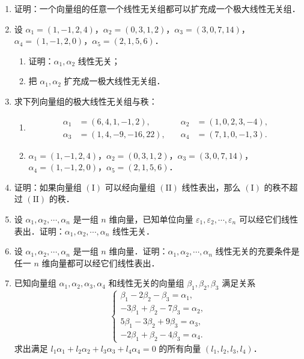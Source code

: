 \begin{enumerate}
  \ansproof
  \item 证明：一个向量组的任意一个线性无关组都可以扩充成一个极大线性无关组．
  \ansproof
  \item 设 $\alpha_1=(1,-1,2,4)$，$\alpha_2=(0,3,1,2)$，$\alpha_3=(3,0,7,14)$，$\alpha_4=(1,-1,2,0)$，$\alpha_5=(2,1,5,6)$．
  \begin{enumerate}
    \item 证明：$\alpha_1,\alpha_2$ 线性无关；
  \anssub
    \item 把 $\alpha_1,\alpha_2$ 扩充成一极大线性无关组．
  \anssub
  \end{enumerate}
  \item 求下列向量组的极大线性无关组与秩：
  \begin{enumerate}
    \item
    \[
      \begin{aligned}
        \alpha_1&=(6,4,1,-1,2),&\quad \alpha_2&=(1,0,2,3,-4),\\
        \alpha_3&=(1,4,-9,-16,22),&\quad \alpha_4&=(7,1,0,-1,3).
      \end{aligned}
    \]
  \anssub
    \item $\alpha_1=(1,-1,2,4)$，$\alpha_2=(0,3,1,2)$，$\alpha_3=(3,0,7,14)$，$\alpha_4=(1,-1,2,0)$，$\alpha_5=(2,1,5,6)$．
  \anssub
  \end{enumerate}
  \item 证明：如果向量组 $\mathrm{(I)}$ 可以经向量组 $\mathrm{(II)}$ 线性表出，那么 $\mathrm{(I)}$ 的秩不超过 $\mathrm{(II)}$ 的秩．
  \ansproof
  \item 设 $\alpha_1,\alpha_2,\cdots,\alpha_n$ 是一组 $n$ 维向量，已知单位向量 $\varepsilon_1,\varepsilon_2,\cdots,\varepsilon_n$ 可以经它们线性表出．证明：$\alpha_1,\alpha_2,\cdots,\alpha_n$ 线性无关．
  \ansproof
  \item 设 $\alpha_1,\alpha_2,\cdots,\alpha_n$ 是一组 $n$ 维向量．证明：$\alpha_1,\alpha_2,\cdots,\alpha_n$ 线性无关的充要条件是任一 $n$ 维向量都可以经它们线性表出．
  \ansproof
  \item 已知向量组 $\alpha_1,\alpha_2,\alpha_3,\alpha_4$ 和线性无关的向量组 $\beta_1,\beta_2,\beta_3$ 满足关系
  \[
    \begin{cases}
      \beta_1-2\beta_2-\beta_3=\alpha_1,\\
      -3\beta_1+\beta_2-7\beta_3=\alpha_2,\\
      5\beta_1-3\beta_2+9\beta_3=\alpha_3,\\
      -2\beta_1+\beta_2-4\beta_3=\alpha_4.
    \end{cases}
  \]
  求出满足 $l_1\alpha_1+l_2\alpha_2+l_3\alpha_3+l_4\alpha_4=0$ 的所有向量 $(l_1,l_2,l_3,l_4)$．

\end{enumerate}

